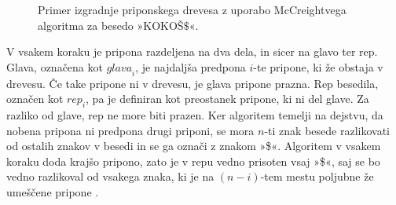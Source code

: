 \begin{figure}[htb]
    \begin{subfigure}[t]{0.3\linewidth}
        \subcaption*{}
        
        \centering
        \label{fig:McCreigov1}
    \end{subfigure}
    \hspace{0.5cm}
    \begin{subfigure}[t]{0.3\linewidth}
        \subcaption*{}
        
        \centering
        \label{fig:McCreigov2}
    \end{subfigure}
    \hspace{0.5cm}
    \begin{subfigure}[t]{0.3\linewidth}
        \subcaption*{}
        
        \centering
        \label{fig:McCreigov3}
    \end{subfigure}
    
    \begin{subfigure}[t]{0.3\linewidth}
        \subcaption*{}
        
        \centering
        \label{fig:McCreigov4}
    \end{subfigure}
    \hspace{0.5cm}
    \begin{subfigure}[t]{0.3\linewidth}
        \subcaption*{}
        
        \centering
        \label{fig:McCreigov5}
    \end{subfigure}
    \hspace{0.5cm}
    \begin{subfigure}[t]{0.3\textwidth}
        \subcaption*{}
        
        \centering
        \label{fig:McCreigov6}
    \end{subfigure}
        \caption{Primer izgradnje priponskega drevesa z uporabo McCreightvega algoritma za besedo »KOKOŠ$\$$«.} 
        \label{fig:McCreight}
\end{figure}

V vsakem koraku je pripona razdeljena na dva dela, in sicer na glavo ter rep. Glava, označena kot $\textit{glava}_i$, je najdaljša predpona $i$-te pripone, ki že obstaja v drevesu. Če take pripone ni v drevesu, je glava pripone prazna. Rep besedila, označen kot $\textit{rep}_i$, pa je definiran kot preostanek pripone, ki ni del glave. Za razliko od glave, rep ne more biti prazen. Ker algoritem temelji na dejstvu, da nobena pripona ni predpona drugi priponi, se mora $n$-ti znak besede razlikovati od ostalih znakov v besedi in se ga označi z znakom »\$«.
Algoritem v vsakem koraku doda krajšo pripono, zato je v repu vedno prisoten vsaj »\$«, saj se bo vedno razlikoval od vsakega znaka, ki je na $(n-i)$-tem mestu poljubne že umeščene pripone \cite{McCreight1976}.


